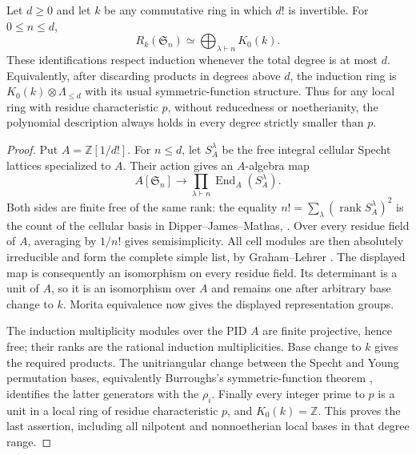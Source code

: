 \begin{proposition}
\label{C:tame_degree}
Let $d\geq0$ and let $k$ be any commutative ring in which $d!$ is
invertible. For $0\leq n\leq d$,
\[
 R_k(\mathfrak S_n)\simeq\bigoplus_{\lambda\vdash n}K_0(k).
\]
These identifications respect induction whenever the total degree is at
most $d$. Equivalently, after discarding products in degrees above $d$,
the induction ring is $K_0(k)\otimes\Lambda_{\leq d}$ with its usual
symmetric-function structure. Thus for any local ring with residue
characteristic $p$, without reducedness or noetherianity, the polynomial
description always holds in every degree strictly smaller than $p$.
\end{proposition}
\begin{proof}
Put $A=\mathbb Z[1/d!]$. For $n\leq d$, let $S_A^\lambda$ be the free
integral cellular Specht lattices specialized to $A$. Their action gives
an $A$-algebra map
\[
 A[\mathfrak S_n]\longrightarrow
       \prod_{\lambda\vdash n}\operatorname{End}_A(S_A^\lambda).
\]
Both sides are finite free of the same rank: the equality
$n!=\sum_\lambda(\operatorname{rank}S_A^\lambda)^2$ is the count of
the cellular basis in Dipper--James--Mathas,
\cite[Theorem 3.26]{C-DipperJamesMathas1998}. Over every residue field
of $A$, averaging by $1/n!$ gives semisimplicity. All cell modules are
then absolutely irreducible and form the complete simple list, by
Graham--Lehrer \cite[Proposition 2.4(i),(v)]{C-GrahamLehrer2004}.
The displayed map is consequently an isomorphism on every residue
field. Its determinant is a unit of $A$, so it is an isomorphism over
$A$ and remains one after arbitrary base change to $k$.
Morita equivalence now gives the displayed representation groups.

The induction multiplicity modules over the PID $A$ are finite
projective, hence free; their ranks are the rational induction
multiplicities. Base change to $k$ gives the required products.
The unitriangular change between the Specht and Young permutation
bases, equivalently Burroughs's symmetric-function theorem
\cite[Theorem 1.2]{C-Burroughs1974}, identifies the latter generators
with the $\rho_i$. Finally every integer prime to $p$ is a unit in a
local ring of residue characteristic $p$, and $K_0(k)=\mathbb Z$.
This proves the last assertion, including all nilpotent and
nonnoetherian local bases in that degree range.
\end{proof}

